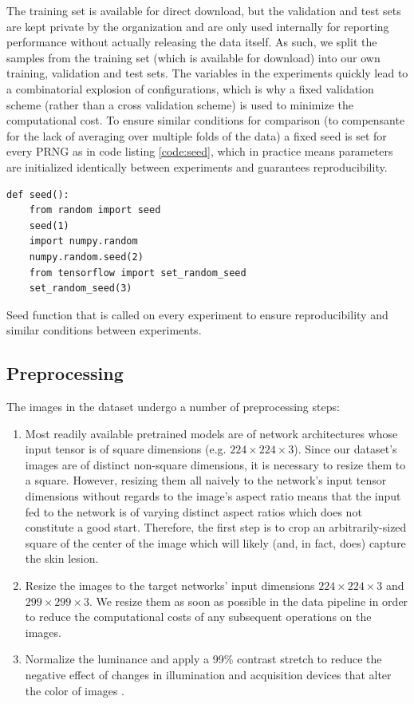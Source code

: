 The training set is available for direct download, but the validation and test sets are kept private by the organization and are only used internally for reporting performance without actually releasing the data itself. As such, we split the samples from the training set (which is available for download) into our own training, validation and test sets. The variables in the experiments quickly lead to a combinatorial explosion of configurations, which is why a fixed validation scheme (rather than a cross validation scheme) is used to minimize the computational cost. To ensure similar conditions for comparison (to compensante for the lack of averaging over multiple folds of the data) a fixed seed is set for every \ac{PRNG} as in code listing \ref{code:seed}, which in practice means parameters are initialized identically between experiments and guarantees reproducibility.

\begin{listing}[ht]
\begin{verbatim}
def seed():
    from random import seed
    seed(1)
    import numpy.random
    numpy.random.seed(2)
    from tensorflow import set_random_seed
    set_random_seed(3)
\end{verbatim}
\caption{Seed function that is called on every experiment to ensure reproducibility and similar conditions between experiments.}
\label{code:seed}
\end{listing}

\subsection{Preprocessing}
\label{subsection:preprocessing}

The images in the dataset undergo a number of preprocessing steps:

\begin{enumerate}
    \item Most readily available pretrained models are of network architectures whose input tensor is of square dimensions (e.g. $224 \times 224 \times 3$). Since our dataset's images are of distinct non-square dimensions, it is necessary to resize them to a square. However, resizing them all naively to the network's input tensor dimensions without regards to the image's aspect ratio means that the input fed to the network is of varying distinct aspect ratios which does not constitute a good start. Therefore, the first step is to crop an arbitrarily-sized square of the center of the image which will likely (and, in fact, does) capture the skin lesion.
    \item Resize the images to the target networks' input dimensions $224 \times 224 \times 3$ and $299 \times 299 \times 3$. We resize them as soon as possible in the data pipeline in order to reduce the computational costs of any subsequent operations on the images.
    \item Normalize the luminance and apply a 99\% contrast stretch to reduce the negative effect of changes in illumination and acquisition devices that alter the color of images \cite{colorconstancy}.
\end{enumerate}

